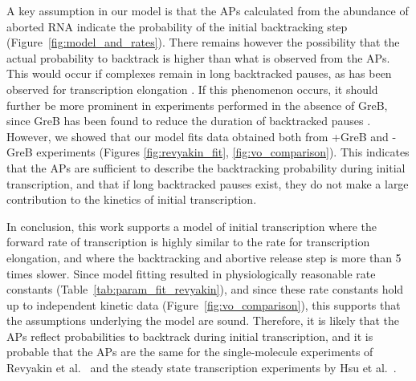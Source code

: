 A key assumption in our model is that the APs calculated from the abundance of
aborted RNA indicate the probability of the initial backtracking step
(Figure~\ref{fig:model_and_rates}). There remains however the possibility that
the actual probability to backtrack is higher than what is observed from the
APs. This would occur if complexes remain in long backtracked
pauses, as has been observed for transcription elongation
\cite{shaevitz_backtracking_2003}. If this phenomenon occurs, it should further
be more prominent in experiments performed in the absence of GreB, since GreB
has been found to reduce the duration of backtracked pauses
\cite{shaevitz_backtracking_2003}. However, we showed that our model fits data
obtained both from +GreB and -GreB experiments (Figures
\ref{fig:revyakin_fit}, \ref{fig:vo_comparison}). This indicates that the APs
are sufficient to describe the backtracking probability during initial
transcription, and that if long backtracked pauses exist, they do not make a
large contribution to the kinetics of initial transcription.

In conclusion, this work supports a model of initial transcription where the
forward rate of transcription is highly similar to the rate for transcription
elongation, and where the backtracking and abortive release step is more than
5 times slower. Since model fitting resulted in physiologically reasonable
rate constants (Table~\ref{tab:param_fit_revyakin}), and since these rate
constants hold up to independent kinetic data
(Figure~\ref{fig:vo_comparison}), this supports that the assumptions
underlying the model are sound. Therefore, it is likely that the APs
reflect probabilities to backtrack during initial transcription, and it is
probable that the APs are the same for the single-molecule experiments of
Revyakin et al.\ \cite{revyakin_abortive_2006} and the steady state
transcription experiments by Hsu et al.\ \cite{hsu_initial_2006}.
 
